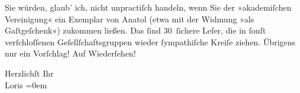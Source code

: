 \pstart
           Sie würden, glaub’ ich, nicht unpractiſch handeln, wenn Sie der »akademiſchen Vereinigung« ein Exemplar von Anatol (etwa mit der Widmung »als Gaſtgeſchenk«) zukommen ließen.
               Das ſind 30 ſichere Leſer, die in ſonſt verſchloſſenen Geſellſchaftsgruppen wieder
               ſympathiſche Kreiſe ziehen. Übrigens nur ein Vorſchlag! Auf Wiederſehen!\pend
           
\pstart
           Herzlichſt Ihr{\\[\baselineskip]}\spacefill\mbox{Loris}\pend
           \leftskip=0em{}\endnumbering{}  
      